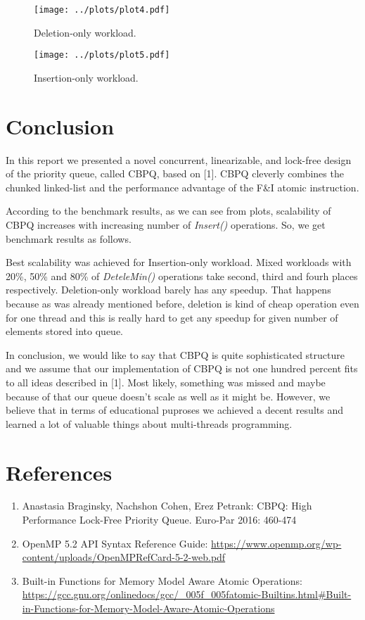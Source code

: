 \documentclass{article}
\begin{document}
\begin{figure}[H]
  \centering
  \texttt{[image: ../plots/plot4.pdf]}
  \caption{Deletion-only workload.}
  \label{fig:plot4}
\end{figure}

\begin{figure}[H]
  \centering
  \texttt{[image: ../plots/plot5.pdf]}
  \caption{Insertion-only workload.}
  \label{fig:plot5}
\end{figure}

\section{Conclusion}
In this report we presented a novel concurrent, linearizable, and lock-free design of the priority queue, called CBPQ, based on [1]. CBPQ cleverly combines the chunked linked-list and the performance advantage of the F\&I atomic instruction.\par
According to the benchmark results, as we can see from plots, scalability of CBPQ increases with increasing number of \textit{Insert()} operations. So, we get benchmark results as follows.\par
Best scalability was achieved for Insertion-only workload. Mixed workloads with 20\%, 50\% and 80\% of \textit{DeteleMin()} operations take second, third and fourh places respectively. Deletion-only workload barely has any speedup. That happens because as was already mentioned before, deletion is kind of cheap operation even for one thread and this is really hard to get any speedup for given number of elements stored into queue.\par
In conclusion, we would like to say that CBPQ is quite sophisticated structure and we assume that our implementation of CBPQ is not one hundred percent fits to all ideas described in [1]. Most likely, something was missed and maybe because of that our queue doesn't scale as well as it might be. However, we believe that in terms of educational puproses we achieved a decent results and learned a lot of valuable things about multi-threads programming.

\pagebreak
\section*{References}
\begin{enumerate}
\item{Anastasia Braginsky, Nachshon Cohen, Erez Petrank: CBPQ: High Performance Lock-Free Priority Queue. Euro-Par 2016: 460-474}
\item{OpenMP 5.2 API Syntax Reference Guide: \url{https://www.openmp.org/wp-content/uploads/OpenMPRefCard-5-2-web.pdf}}
\item{Built-in Functions for Memory Model Aware Atomic Operations: \url{https://gcc.gnu.org/onlinedocs/gcc/_005f_005fatomic-Builtins.html#Built-in-Functions-for-Memory-Model-Aware-Atomic-Operations}}
\end{enumerate}
\end{document}
